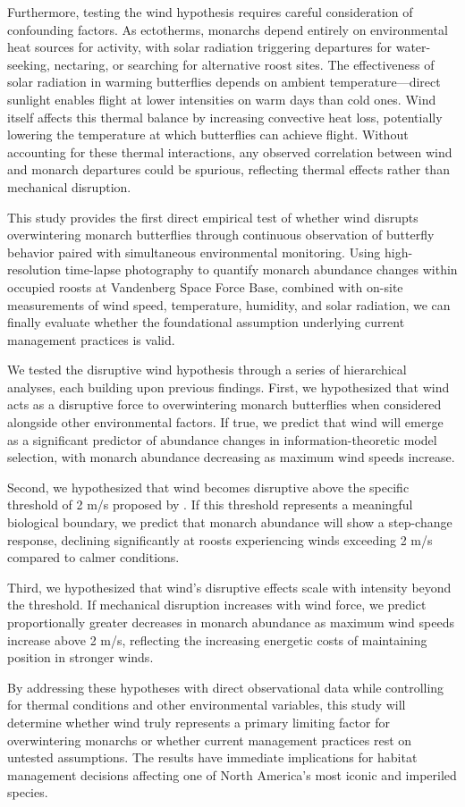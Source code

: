 Furthermore, testing the wind hypothesis requires careful consideration of confounding factors. As ectotherms, monarchs depend entirely on environmental heat sources for activity, with solar radiation triggering departures for water-seeking, nectaring, or searching for alternative roost sites. The effectiveness of solar radiation in warming butterflies depends on ambient temperature---direct sunlight enables flight at lower intensities on warm days than cold ones. Wind itself affects this thermal balance by increasing convective heat loss, potentially lowering the temperature at which butterflies can achieve flight. Without accounting for these thermal interactions, any observed correlation between wind and monarch departures could be spurious, reflecting thermal effects rather than mechanical disruption.

This study provides the first direct empirical test of whether wind disrupts overwintering monarch butterflies through continuous observation of butterfly behavior paired with simultaneous environmental monitoring. Using high-resolution time-lapse photography to quantify monarch abundance changes within occupied roosts at Vandenberg Space Force Base, combined with on-site measurements of wind speed, temperature, humidity, and solar radiation, we can finally evaluate whether the foundational assumption underlying current management practices is valid.

We tested the disruptive wind hypothesis through a series of hierarchical analyses, each building upon previous findings. First, we hypothesized that wind acts as a disruptive force to overwintering monarch butterflies when considered alongside other environmental factors. If true, we predict that wind will emerge as a significant predictor of abundance changes in information-theoretic model selection, with monarch abundance decreasing as maximum wind speeds increase.

Second, we hypothesized that wind becomes disruptive above the specific threshold of 2 m/s proposed by \citet{leongEvaluationManagementCalifornia2016}. If this threshold represents a meaningful biological boundary, we predict that monarch abundance will show a step-change response, declining significantly at roosts experiencing winds exceeding 2 m/s compared to calmer conditions.

Third, we hypothesized that wind's disruptive effects scale with intensity beyond the threshold. If mechanical disruption increases with wind force, we predict proportionally greater decreases in monarch abundance as maximum wind speeds increase above 2 m/s, reflecting the increasing energetic costs of maintaining position in stronger winds.

By addressing these hypotheses with direct observational data while controlling for thermal conditions and other environmental variables, this study will determine whether wind truly represents a primary limiting factor for overwintering monarchs or whether current management practices rest on untested assumptions. The results have immediate implications for habitat management decisions affecting one of North America's most iconic and imperiled species.
